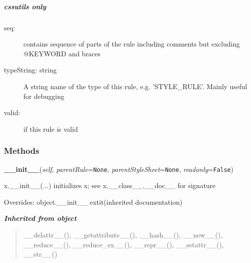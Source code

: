 \hypertarget{cssutils-only}{}
\subparagraph*{cssutils only}
\label{cssutils-only}
\begin{description}
\item[{seq:}] \leavevmode 
contains sequence of parts of the rule including comments but
excluding @KEYWORD and braces

\item[{typeString: string}] \leavevmode 
A string name of the type of this rule, e.g. 'STYLE{\_}RULE'. Mainly
useful for debugging

\item[{valid:}] \leavevmode 
if this rule is valid

\end{description}


  \subsubsection{Methods}

    \vspace{0.5ex}

\hspace{.8\funcindent}\begin{boxedminipage}{\funcwidth}

    \raggedright \textbf{\_\_init\_\_}(\textit{self}, \textit{parentRule}={\tt None}, \textit{parentStyleSheet}={\tt None}, \textit{readonly}={\tt False})

\setlength{\parskip}{2ex}
    x.\_\_init\_\_(...) initializes x; see x.\_\_class\_\_.\_\_doc\_\_ for 
    signature

\setlength{\parskip}{1ex}
      Overrides: object.\_\_init\_\_ 	extit{(inherited documentation)}

    \end{boxedminipage}


\large{\textbf{\textit{Inherited from object}}}

\begin{quote}
\_\_delattr\_\_(), \_\_getattribute\_\_(), \_\_hash\_\_(), \_\_new\_\_(), \_\_reduce\_\_(), \_\_reduce\_ex\_\_(), \_\_repr\_\_(), \_\_setattr\_\_(), \_\_str\_\_()
\end{quote}

